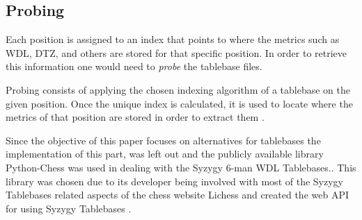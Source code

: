 \subsection{Probing}
Each position is assigned to an index that points to where the metrics such as WDL, DTZ, and others are stored for that specific position. In order to retrieve this information one would need to \textit{probe} the tablebase files.

Probing consists of applying the chosen indexing algorithm of a tablebase on the given position. Once the unique index is calculated, it is used to locate where the metrics of that position are stored in order to extract them \cite{chesswikiEGTB}.

Since the objective of this paper focuses on alternatives for tablebases the implementation of this part, was left out and the publicly available library Python-Chess \cite{pychess} was used in dealing with the Syzygy 6-man WDL Tablebases.. This library was chosen due to its developer being involved with most of the Syzygy Tablebases related aspects of the chess website Lichess and created the web API for using Syzygy Tablebases \cite{lichess}\cite{syzygyAPI}.